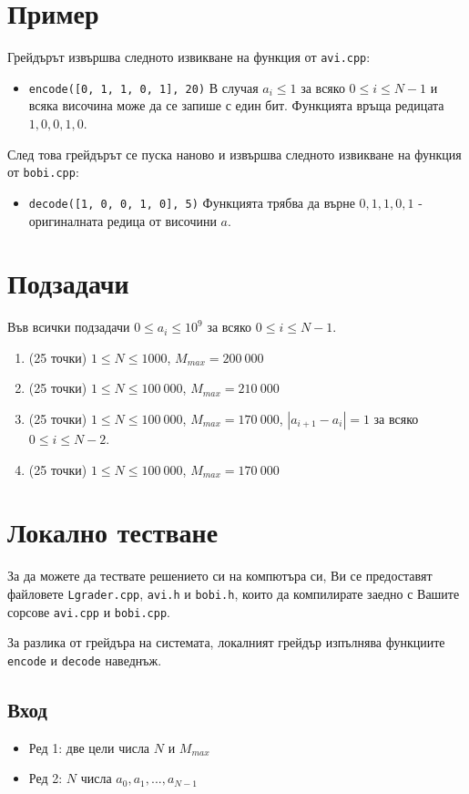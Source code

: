 \documentclass[a4paper,11pt]{article}
\newcommand{\code}[1]{\texttt{#1}}
\newcommand{\noskip}{\vspace{-\parskip}}
\begin{document}
\section*{Пример}
Грейдърът извършва следното извикване на функция от \code{avi.cpp}:
\noskip
\begin{itemize}
    \item \code{encode([0, 1, 1, 0, 1], 20)}
        В случая $a_i \leq 1$ за всяко $0 \leq i \leq N-1$ и всяка височина може
        да се запише с един бит.
        Функцията връща редицата $1, 0, 0, 1, 0$.
\end{itemize}
След това грейдърът се пуска наново и извършва следното извикване на функция от
\code{bobi.cpp}:
\noskip
\begin{itemize}
    \item \code{decode([1, 0, 0, 1, 0], 5)}
        Функцията трябва да върне $0, 1, 1, 0, 1$ - оригиналната редица от
        височини $a$.
\end{itemize}

\section*{Подзадачи}
Във всички подзадачи $0 \leq a_i \leq 10^9$ за всяко $0 \leq i \leq N - 1$.

\begin{enumerate}
    \item (25 точки) $1 \leq N \leq 1000$, $M_{max}=200\ 000$
    \item (25 точки) $1 \leq N \leq 100\ 000$, $M_{max}=210\ 000$
    \item (25 точки) $1 \leq N \leq 100\ 000$, $M_{max}=170\ 000$,
        $|a_{i + 1} - a_i| = 1$ за всяко $0 \leq i \leq N-2$.
    \item (25 точки) $1 \leq N \leq 100\ 000$, $M_{max}=170\ 000$
\end{enumerate}

\section*{Локално тестване}
За да можете да тествате решението си на компютъра си, Ви се предоставят
файловете \code{Lgrader.cpp}, \code{avi.h} и \code{bobi.h}, които да компилирате
заедно с Вашите сорсове \code{avi.cpp} и \code{bobi.cpp}. 

За разлика от грейдъра на системата, локалният грейдър изпълнява функциите 
\code{encode} и \code{decode} наведнъж.
\noskip
\subsection*{Вход}
\noskip
\begin{itemize}
    \item Ред 1: две цели числа $N$ и $M_{max}$
    \item Ред 2: $N$ числа $a_0, a_1, ..., a_{N-1}$
\end{itemize}
\noskip
\end{document}
